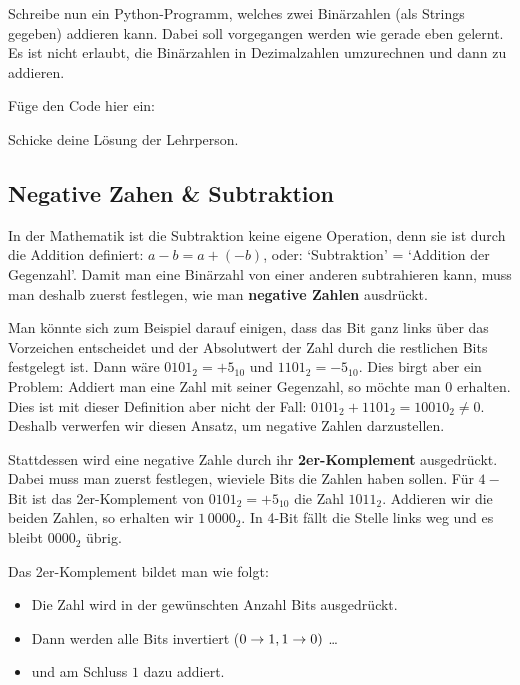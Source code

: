 \newpage


\begin{question}
	Schreibe nun ein Python-Programm, welches zwei Binärzahlen (als Strings gegeben) addieren kann.
	Dabei soll vorgegangen werden wie gerade eben gelernt. Es ist nicht erlaubt, die Binärzahlen in Dezimalzahlen umzurechnen und dann zu addieren.

	Füge den Code hier ein:
\end{question}
\begin{solution}
	Schicke deine Lösung der Lehrperson.
\end{solution}

\newpage

\subsection{Negative Zahen \& Subtraktion}

In der Mathematik ist die Subtraktion keine eigene Operation, denn sie ist durch die Addition definiert: $a - b = a + (-b)$, oder: `Subtraktion' = `Addition der Gegenzahl'.
Damit man eine Binärzahl von einer anderen subtrahieren kann, muss man deshalb zuerst festlegen, wie man \textbf{negative Zahlen} ausdrückt.

Man könnte sich zum Beispiel darauf einigen, dass das Bit ganz links über das Vorzeichen entscheidet und der Absolutwert der Zahl durch die restlichen Bits festgelegt ist. Dann wäre $0101_2 = +5_{10}$ und $1101_2 = -5_{10}$. Dies birgt aber ein Problem: Addiert man eine Zahl mit seiner Gegenzahl, so möchte man $0$ erhalten. Dies ist mit dieser Definition aber nicht der Fall: $0101_2 + 1101_2 = 10010_2 \neq 0.$ Deshalb verwerfen wir diesen Ansatz, um negative Zahlen darzustellen.

Stattdessen wird eine negative Zahle durch ihr \textbf{2er-Komplement} ausgedrückt. Dabei muss man zuerst festlegen, wieviele Bits die Zahlen haben sollen. Für $4-$Bit ist das 2er-Komplement von $0101_2 = +5_{10}$ die Zahl $1011_2$. Addieren wir die beiden Zahlen, so erhalten wir $1\,0000_2$. In 4-Bit fällt die Stelle links weg und es bleibt $0000_2$ übrig.

Das 2er-Komplement bildet man wie folgt:
\vspace{-0.4cm}
\begin{itemize}
	\item Die Zahl wird in der gewünschten Anzahl Bits ausgedrückt.
	\item Dann werden alle Bits invertiert ($0 \rightarrow 1, 1 \rightarrow 0)$ \ldots
	\item und am Schluss $1$ dazu addiert.
\end{itemize}

